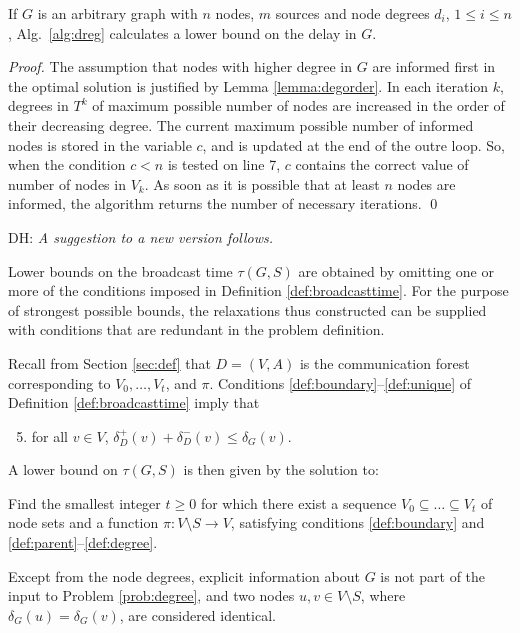 \begin{proposition}
If $G$ is an arbitrary graph with $n$ nodes, $m$ sources and node degrees $d_i$, $1\leq i\leq n$, Alg.~\ref{alg:dreg} calculates a lower bound on the delay in $G$.
\label{prop:deg}
\end{proposition}
\begin{proof}
The assumption that nodes with higher degree in $G$ are informed first in the optimal solution is justified by Lemma \ref{lemma:degorder}.
In each iteration $k$, degrees in $T^k$ of maximum possible number of nodes are increased in the order of their decreasing degree.
The current maximum possible number of informed nodes is stored in the variable $c$, and is updated at the end of the outre loop.
So, when the condition $c<n$ is tested on line 7, $c$ contains the correct value of number of nodes in $V_k$.
As soon as it is possible that at least $n$ nodes are informed, the algorithm returns the number of necessary iterations.
\qed
\end{proof}


DH: \emph{A suggestion to a new version follows.}
\bigskip

Lower bounds on the broadcast time $\tau(G,S)$ are obtained by omitting one or more of the conditions imposed in Definition \ref{def:broadcasttime}.
For the purpose of strongest possible bounds, the relaxations thus constructed can be supplied with conditions that are redundant in the problem definition.

Recall from Section \ref{sec:def} that $D=(V,A)$ is the communication forest corresponding to $V_0,\ldots,V_t$, and $\pi$.
Conditions \ref{def:boundary}--\ref{def:unique} of Definition \ref{def:broadcasttime} imply that
\begin{enumerate}
\setcounter{enumi}{4}
  \item for all $v\in V$, $\delta_D^+(v)+\delta_D^-(v)\leq\delta_G(v)$. \label{def:degree}
\end{enumerate}

\noindent
A lower bound on $\tau(G,S)$ is then given by the solution to:
\begin{problem}\label{prob:degree}
Find the smallest integer $t\geq 0$ for which there exist
a sequence $V_0\subseteq\dots\subseteq V_t$ of node sets and a function $\pi:V\setminus S\to V$,
satisfying conditions \ref{def:boundary} and \ref{def:parent}--\ref{def:degree}.
\end{problem}

Except from the node degrees, explicit information about $G$ is not part of the input to Problem \ref{prob:degree},
and two nodes $u,v\in V\setminus S$, where $\delta_G(u)=\delta_G(v)$, are considered identical.

